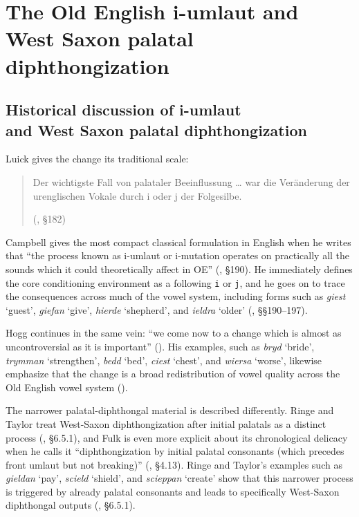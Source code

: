 \documentclass[
  british,
  a4paper,
  openany]{book}
\providecommand{\texorpdfstring}[2]{#1}
\DeclareRobustCommand{\CAPRHeadingBreak}{%
  \texorpdfstring{\\}{ }%
}
\begin{document}
\newpage

\section{The Old English i-umlaut and West Saxon palatal
diphthongization}\label{the-old-english-i-umlaut-and-west-saxon-palatal-diphthongization}

\subsection{\texorpdfstring{Historical discussion of i-umlaut
\CAPRHeadingBreak and West Saxon palatal
diphthongization}{Historical discussion of i-umlaut and West Saxon palatal diphthongization}}\label{historical-discussion-of-i-umlaut-and-west-saxon-palatal-diphthongization}

Luick gives the change its traditional scale:

\begin{quote}
Der wichtigste Fall von palataler Beeinflussung \ldots{} war die
Veränderung der urenglischen Vokale durch i oder j der Folgesilbe.

(, §182)
\end{quote}

Campbell gives the most compact classical formulation in English when he
writes that ``the process known as i-umlaut or i-mutation operates on
practically all the sounds which it could theoretically affect in OE''
(, §190). He immediately
defines the core conditioning environment as a following \texttt{i} or
\texttt{j}, and he goes on to trace the consequences across much of the
vowel system, including forms such as \emph{giest} `guest',
\emph{giefan} `give', \emph{hierde} `shepherd', and \emph{ieldra}
`older' (,
§§190--197).

Hogg continues in the same vein: ``we come now to a change which is
almost as uncontroversial as it is important''
(). His examples, such as
\emph{bryd} `bride', \emph{trymman} `strengthen', \emph{bedd} `bed',
\emph{ciest} `chest', and \emph{wiersa} `worse', likewise emphasize that
the change is a broad redistribution of vowel quality across the Old
English vowel system ().

The narrower palatal-diphthongal material is described differently.
Ringe and Taylor treat West-Saxon diphthongization after initial
palatals as a distinct process (, §6.5.1), and Fulk is even more explicit about its
chronological delicacy when he calls it ``diphthongization by initial
palatal consonants (which precedes front umlaut but not breaking)''
(, §4.13). Ringe and Taylor's
examples such as \emph{gieldan} `pay', \emph{scield} `shield', and
\emph{scieppan} `create' show that this narrower process is triggered by
already palatal consonants and leads to specifically West-Saxon
diphthongal outputs (, §6.5.1).
\end{document}
